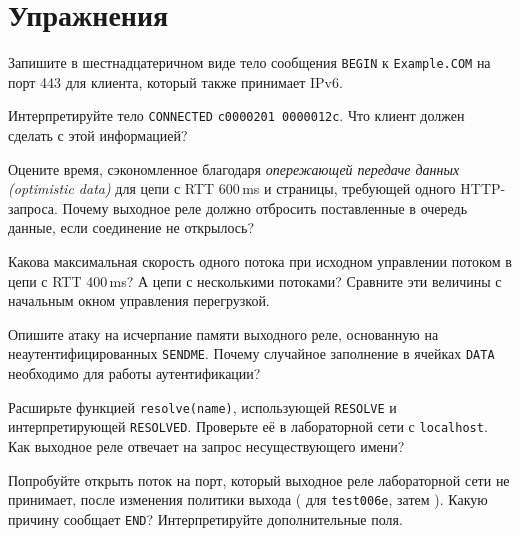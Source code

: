 \section*{Упражнения}

\begin{esercizio}[1]\label{es:11-begin}
Запишите в шестнадцатеричном виде тело сообщения \texttt{BEGIN} к \texttt{Example.COM} на порт 443 для клиента, который также принимает IPv6.
\end{esercizio}

\begin{esercizio}[1]\label{es:11-connected}
Интерпретируйте тело \texttt{CONNECTED} \texttt{c0000201 0000012c}. Что клиент должен сделать с этой информацией?
\end{esercizio}

\begin{esercizio}[1]\label{es:11-optimistic}
Оцените время, сэкономленное благодаря \emph{опережающей передаче данных (optimistic data)} для цепи с RTT 600\,ms и страницы, требующей одного HTTP-запроса. Почему выходное реле должно отбросить поставленные в очередь данные, если соединение не открылось?
\end{esercizio}

\begin{esercizio}[2]\label{es:11-velocita}
Какова максимальная скорость одного потока при исходном управлении потоком в цепи с RTT 400\,ms? А цепи с несколькими потоками? Сравните эти величины с начальным окном управления перегрузкой.
\end{esercizio}

\begin{esercizio}[2]\label{es:11-sendme-falso}
Опишите атаку на исчерпание памяти выходного реле, основанную на неаутентифицированных \texttt{SENDME}. Почему случайное заполнение в ячейках \texttt{DATA} необходимо для работы аутентификации?
\end{esercizio}

\begin{esercizio}[2]\label{es:11-resolve}
Расширьте  функцией \texttt{resolve(name)}, использующей \texttt{RESOLVE} и интерпретирующей \texttt{RESOLVED}. Проверьте её в лабораторной сети с \texttt{localhost}. Как выходное реле отвечает на запрос несуществующего имени?
\end{esercizio}

\begin{esercizio}[3]\label{es:11-policy}
Попробуйте открыть поток на порт, который выходное реле лабораторной сети не принимает, после изменения политики выхода ( для \texttt{test006e}, затем ). Какую причину сообщает \texttt{END}? Интерпретируйте дополнительные поля.
\end{esercizio}

